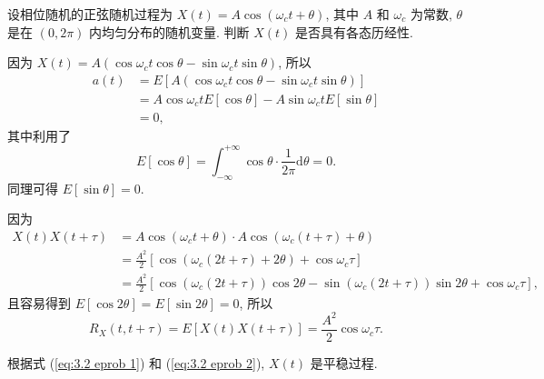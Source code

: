 \begin{exampleprob}[各态历经性的判断]
    设相位随机的正弦随机过程为 $X(t)=A\cos(\omega_ct+\theta)$, 其中 $A$ 和 $\omega_c$ 为常数, $\theta$ 是在 $(0,2\pi)$ 内均匀分布的随机变量. 判断 $X(t)$ 是否具有各态历经性.

    \begin{solution}
        因为 $X(t)=A(\cos\omega_ct\cos\theta-\sin\omega_ct\sin\theta)$, 所以
        \begin{equation} \label{eq:3.2 eprob 1}
            \begin{aligned}
                a(t) & =E[A(\cos\omega_ct\cos\theta-\sin\omega_ct\sin\theta)]   \\
                     & =A\cos\omega_ctE[\cos\theta]-A\sin\omega_ctE[\sin\theta] \\
                     & =0,
            \end{aligned}
        \end{equation}
        其中利用了
        \begin{equation*}
            E[\cos\theta]=\int_{-\infty}^{+\infty}\cos\theta\cdot\frac{1}{2\pi}\mathrm{d}\theta=0.
        \end{equation*}
        同理可得 $E[\sin\theta]=0$.

        因为
        \begin{equation*}
            \begin{aligned}
                X(t)X(t+\tau) & =A\cos(\omega_ct+\theta)\cdot A\cos(\omega_c(t+\tau)+\theta)                                            \\
                              & =\frac{A^2}{2}[\cos(\omega_c(2t+\tau)+2\theta)+\cos\omega_c\tau]                                        \\
                              & =\frac{A^2}{2}[\cos(\omega_c(2t+\tau))\cos2\theta-\sin(\omega_c(2t+\tau))\sin2\theta+\cos\omega_c\tau],
            \end{aligned}
        \end{equation*}
        且容易得到 $E[\cos2\theta]=E[\sin2\theta]=0$, 所以
        \begin{equation} \label{eq:3.2 eprob 2}
            R_X(t,t+\tau)=E[X(t)X(t+\tau)]=\frac{A^2}{2}\cos\omega_c\tau.
        \end{equation}

        根据式 (\ref{eq:3.2 eprob 1}) 和 (\ref{eq:3.2 eprob 2}), $X(t)$ 是平稳过程.


\end{solution}
\end{exampleprob}
